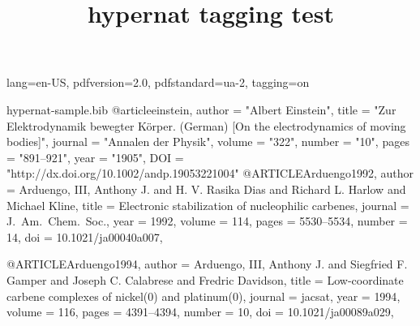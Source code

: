 \DocumentMetadata
  {
    lang=en-US,
    pdfversion=2.0,
    pdfstandard=ua-2,
    tagging=on
  }
\begin{filecontents}{hypernat-sample.bib}
@article{einstein,
    author =       "Albert Einstein",
    title =        "{Zur Elektrodynamik bewegter K{\"o}rper}. ({German})
        [{On} the electrodynamics of moving bodies]",
    journal =      "Annalen der Physik",
    volume =       "322",
    number =       "10",
    pages =        "891--921",
    year =         "1905",
    DOI =          "http://dx.doi.org/10.1002/andp.19053221004"
}
@ARTICLE{Arduengo1992,
  author = {Arduengo, III, Anthony J. and H. V. Rasika Dias and
    Richard L. Harlow and Michael Kline},
  title = {Electronic stabilization of nucleophilic carbenes},
  journal = {J.~Am.\ Chem.\ Soc.},
  year = {1992},
  volume = {114},
  pages = {5530--5534},
  number = {14},
  doi = {10.1021/ja00040a007},
}

@ARTICLE{Arduengo1994,
  author = {Arduengo, III, Anthony J. and Siegfried F. Gamper and
    Joseph C. Calabrese and Fredric Davidson},
  title = {{Low}-coordinate carbene complexes of nickel(0) and
    platinum(0)},
  journal = {jacsat},
  year = {1994},
  volume = {116},
  pages = {4391--4394},
  number = {10},
  doi = {10.1021/ja00089a029},
}
\end{filecontents}

\documentclass{article}

\usepackage[numbers,sort&compress]{natbib}
\usepackage{hyperref}
\usepackage{hypernat}

\title{hypernat tagging test}



Some text \cite{einstein,Arduengo1992} some more text.

Some text ending a sentence \cite{einstein,Arduengo1992,Arduengo1994}.




